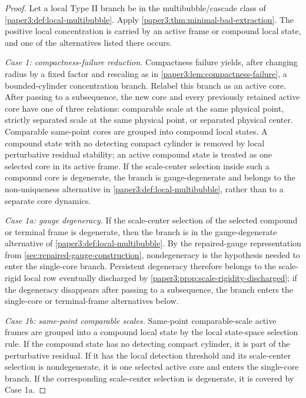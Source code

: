 \documentclass[11pt]{amsart}
\theoremstyle{plain}
\theoremstyle{definition}
\theoremstyle{remark}
\begin{document}
\begin{proof}
Let a local Type II branch be in the multibubble/cascade class of
\cref{paper3:def:local-multibubble}.  Apply \cref{paper3:thm:minimal-bad-extraction}.  The
positive local concentration is carried by an active frame or compound local state,
and one of the alternatives listed there occurs.
\par
\textit{Case 1: compactness-failure reduction.}
Compactness failure yields, after changing radius by a fixed factor and
rescaling as in \cref{paper3:lem:compactness-failure}, a bounded-cylinder concentration
branch.  Relabel this branch as an active core.  After passing to a subsequence,
the new core and every previously retained active core have one of three
relations: comparable scale at the same physical point, strictly separated scale
at the same physical point, or separated physical center.  Comparable same-point
cores are grouped into compound local states.  A compound state with no
detecting compact cylinder is removed by local perturbative residual stability;
an active compound state is treated as one
selected core in its active frame.  If the scale-center selection inside such a
compound core is degenerate, the branch is gauge-degenerate and belongs to the
non-uniqueness alternative in \cref{paper3:def:local-multibubble}, rather than to
a separate core dynamics.
\par
\textit{Case 1a: gauge degeneracy.}
If the scale-center selection of the selected compound or terminal frame is
degenerate, then the branch is in the gauge-degenerate alternative of
\cref{paper3:def:local-multibubble}.  By the repaired-gauge representation
from \cref{sec:repaired-gauge-construction}, nondegeneracy is the hypothesis needed to enter the
single-core branch.  Persistent degeneracy therefore belongs to the
scale-rigid local row eventually discharged by \cref{paper3:prop:scale-rigidity-discharged}; if the degeneracy
disappears after passing to a subsequence, the branch enters the single-core or
terminal-frame alternatives below.
\par
\textit{Case 1b: same-point comparable scales.}
Same-point comparable-scale active frames are grouped into a compound local
state by the local state-space selection rule.  If the compound state has no
detecting compact cylinder, it is part of the perturbative residual.  If it has
the local detection threshold and its scale-center selection is nondegenerate,
it is one selected active core and enters the single-core branch.  If the
corresponding scale-center selection is degenerate, it is covered by Case 1a.

\end{proof}
\end{document}
